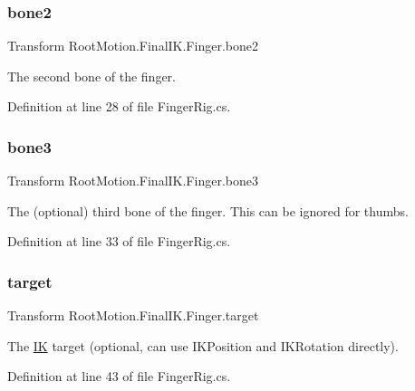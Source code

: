 \subsubsection{\texorpdfstring{bone2}{bone2}}
{\footnotesize\ttfamily Transform Root\+Motion.\+Final\+I\+K.\+Finger.\+bone2}



The second bone of the finger. 



Definition at line 28 of file Finger\+Rig.\+cs.

\mbox{\label{class_root_motion_1_1_final_i_k_1_1_finger_a54e39bb6774532ac0e36128f010d294a}} 
\subsubsection{\texorpdfstring{bone3}{bone3}}
{\footnotesize\ttfamily Transform Root\+Motion.\+Final\+I\+K.\+Finger.\+bone3}



The (optional) third bone of the finger. This can be ignored for thumbs. 



Definition at line 33 of file Finger\+Rig.\+cs.

\mbox{\label{class_root_motion_1_1_final_i_k_1_1_finger_a51474eeb423e2acf8ac4f33a19055086}} 
\subsubsection{\texorpdfstring{target}{target}}
{\footnotesize\ttfamily Transform Root\+Motion.\+Final\+I\+K.\+Finger.\+target}



The \mbox{\hyperlink{class_root_motion_1_1_final_i_k_1_1_i_k}{IK}} target (optional, can use I\+K\+Position and I\+K\+Rotation directly). 



Definition at line 43 of file Finger\+Rig.\+cs.

